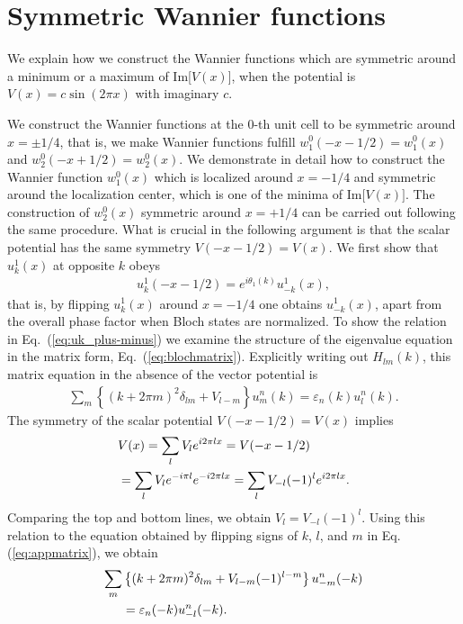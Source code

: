 \documentclass[prb,superscriptaddress,floatfix,twocolumn,showpacs]{revtex4-2}
\begin{document}
\appendix


\section{Symmetric Wannier functions}
\label{sec:wannier}
We explain how we construct the Wannier functions which are symmetric around a minimum or a maximum of Im[$V(x)$], when the potential is $V(x) = c \sin( 2\pi x )$ with imaginary $c$. 

We construct the Wannier functions at the 0-th unit cell to be symmetric around $x = \pm1/4$, that is, we make Wannier functions fulfill $w_1^0(-x-1/2) = w_1^0 (x)$ and $w_2^0(-x+1/2) = w_2^0 (x)$. 
We demonstrate in detail how to construct the Wannier function $w_1^0(x)$ which is localized around $x = -1/4$ and symmetric around the localization center, which is one of the minima of Im[$V(x)]$. 
The construction of $w_2^0(x)$ symmetric around $x=+1/4$ can be carried out following the same procedure. 
What is crucial in the following argument is that the scalar potential has the same symmetry $V(-x-1/2) = V(x)$. 
We first show that $u_k^1(x)$ at opposite $k$ obeys
\begin{align}
    u_k^1(-x-1/2) = e^{i\theta_1(k)} u_{-k}^1(x), 
    \label{eq:uk_plus-minus}
\end{align}
that is, by flipping $u_k^1(x)$ around $x = -1/4$ one obtains $u_{-k}^1(x)$, apart from the overall phase factor when Bloch states are normalized. 
To show the relation in Eq.~(\ref{eq:uk_plus-minus}) we examine the structure of the eigenvalue equation in the matrix form, Eq.~(\ref{eq:blochmatrix}). 
Explicitly writing out $H_{lm}(k)$, this matrix equation in the absence of the vector potential is
\begin{align}
    \sum_m \left\{ (k+2\pi m)^2 \delta_{lm} + V_{l-m} \right\} u_m^n(k) = \varepsilon_n(k) u_l^n (k).
    \label{eq:appmatrix}
\end{align}
The symmetry of the scalar potential $V(-x-1/2) = V(x)$ implies
\begin{align}
    &V(x) = \sum_l V_l e^{i2\pi l x} = V(-x-1/2)\notag \\
    & = \sum_{l}V_l e^{-i \pi l} e^{-i2\pi l x} = \sum_{l}V_{-l}(-1)^{l} e^{i2\pi l x}.
\end{align}
Comparing the top and bottom lines, we obtain $V_l = V_{-l}(-1)^l$.
Using this relation to the equation obtained by flipping signs of $k$, $l$, and $m$ in Eq. (\ref{eq:appmatrix}), we obtain
\begin{align}
    \sum_m &\left\{ (k+2\pi m)^2 \delta_{lm} + V_{l-m}(-1)^{l-m} \right\} u_{-m}^n(-k) \notag \\
    &= \varepsilon_n(-k) u_{-l}^n (-k).
\end{align}
\end{document}
